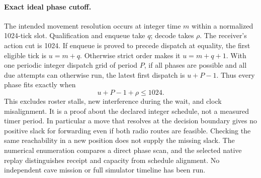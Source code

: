 \documentclass{article}
\begin{document}
\paragraph{Exact ideal phase cutoff.}
The intended movement resolution occurs at integer time \(m\)
within a normalized 1024-tick slot. Qualification and enqueue
take \(q\); decode takes \(\rho\). The receiver's action cut is
1024. If enqueue is proved to precede dispatch at equality,
the first eligible tick is \(u=m+q\). Otherwise strict order
makes it \(u=m+q+1\). With one periodic integer dispatch grid of
period \(P\), if all phases are possible and all due attempts
can otherwise run, the latest first dispatch is \(u+P-1\).
Thus every phase fits exactly when
\[
 u+P-1+\rho\le1024.
\]
This excludes roster stalls, new interference during the wait,
and clock misalignment. It is a proof about the declared
integer schedule, not a measured timer period. In particular a
move that resolves at the decision boundary gives no positive
slack for forwarding even if both radio routes are feasible.
Checking the same reachability in a new position does not supply
the missing slack. The numerical enumeration compares a direct
phase scan, and the selected native replay distinguishes receipt
and capacity from schedule alignment. No independent cave
mission or full simulator timeline has been run.
\end{document}
